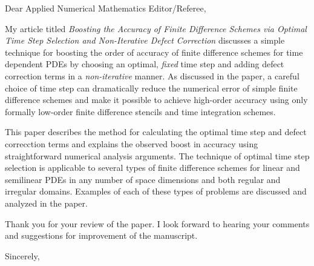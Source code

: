 \documentclass[12pt]{letter}
\begin{document}
\address{}
\signature{Kevin T. Chu}

\begin{letter}
{
}

\opening{Dear Applied Numerical Mathematics Editor/Referee,}

My article titled \emph{Boosting the Accuracy of Finite Difference Schemes via
Optimal Time Step Selection and Non-Iterative Defect Correction} discusses a 
simple technique for boosting the order of accuracy of finite difference 
schemes for time dependent PDEs by choosing an optimal, \emph{fixed} time step
and adding defect correction terms in a \emph{non-iterative} manner.  As 
discussed in the paper, a careful choice of time step can dramatically 
reduce the numerical error of simple finite difference schemes and make 
it possible to achieve high-order accuracy using only formally low-order 
finite difference stencils and time integration schemes.  

This paper describes the method for calculating the optimal time step and
defect correcction terms and explains the observed boost in accuracy using 
straightforward numerical analysis arguments.  The technique of optimal time 
step selection is applicable to several types of finite difference schemes
for linear and semilinear PDEs in any number of space dimensions and both 
regular and irregular domains.  Examples of each of these types of problems 
are discussed and analyzed in the paper.

Thank you for your review of the paper.  I look forward to hearing your 
comments and suggestions for improvement of the manuscript.

\closing{Sincerely,}

\end{letter}
\end{document}
